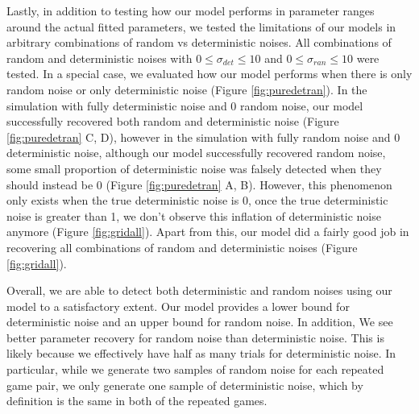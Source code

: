 \documentclass[12pt]{article}
\begin{document}
	Lastly, in addition to testing how our model performs in parameter ranges around the actual fitted parameters, we tested the limitations of our models in arbitrary combinations of random vs deterministic noises. All combinations of random and deterministic noises with $0 \le \sigma_{det} \le 10$ and $0 \le \sigma_{ran} \le 10$ were tested. In a special case, we evaluated how our model performs when there is only random noise or only deterministic noise (Figure \ref{fig:puredetran}). In the simulation with fully deterministic noise and 0 random noise, our model successfully recovered both random and deterministic noise (Figure \ref{fig:puredetran} C, D), however in the simulation with fully random noise and 0 deterministic noise, although our model successfully recovered random noise, some small proportion of deterministic noise was falsely detected when they should instead be 0 (Figure \ref{fig:puredetran} A, B). However, this phenomenon only exists when the true deterministic noise is 0, once the true deterministic noise is greater than 1, we don't observe this inflation of deterministic noise anymore (Figure \ref{fig:gridall}). Apart from this, our model did a fairly good job in recovering all combinations of random and deterministic noises (Figure \ref{fig:gridall}).
	
	
	Overall, we are able to detect both deterministic and random noises using our model to a satisfactory extent. Our model provides a lower bound for deterministic noise and an upper bound for random noise. In addition, We see better parameter recovery for random noise than deterministic noise. This is likely because we effectively have half as many trials for deterministic noise. In particular, while we generate two samples of random noise for each repeated game pair, we only generate one sample of deterministic noise, which by definition is the same in both of the repeated games. 
	
	
\end{document}

